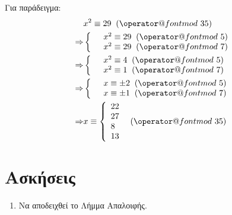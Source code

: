 \documentclass[11pt,a4paper]{book}
\makeatletter
\def\imod#1{\allowbreak\mkern10mu({\operator@font mod}\,\,#1)}
\makeatother
\begin{document}
Για παράδειγμα:
\begin{align*}
	&x^2 \equiv 29 \imod {35}\\
	\Rightarrow &
	\left\{\begin{array}{ll} & x^2 \equiv 29 \imod 5\\
	& x^2 \equiv 29 \imod 7\end{array}\right.\\
	\Rightarrow &
	\left\{\begin{array}{ll} & x^2 \equiv 4 \imod 5\\
	& x^2 \equiv 1 \imod 7\end{array}\right.\\
	\Rightarrow &
	\left\{\begin{array}{ll} & x \equiv \pm 2 \imod 5\\
	& x \equiv \pm 1 \imod 7\end{array}\right.\\
	\Rightarrow &
	x \equiv \left\{\begin{array}{llll} 22\\27\\8\\13 \end{array}\right. \imod {35}
\end{align*}

\section*{Ασκήσεις}
\begin{enumerate}
	\item Να αποδειχθεί το Λήμμα Απαλοιφής.
\end{enumerate}

\end{document}
